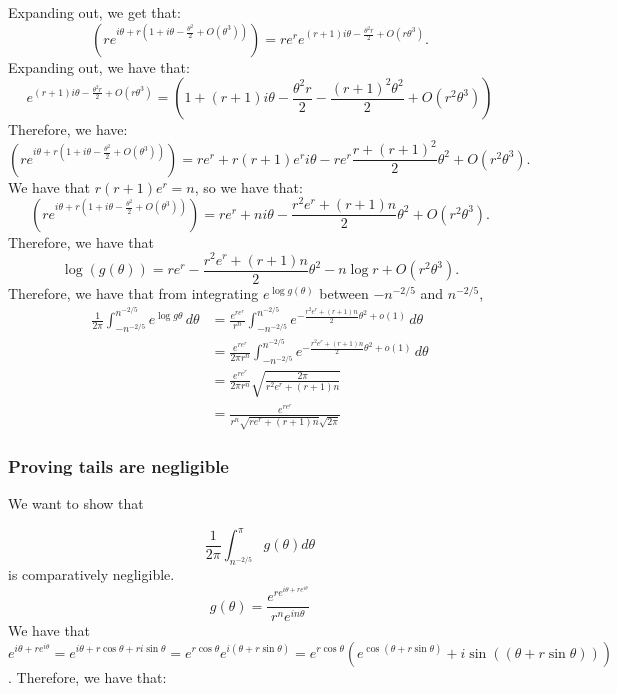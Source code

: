 \documentclass[]{article}
\theoremstyle{definition}
\numberwithin{theorem}{section}
\numberwithin{equation}{section}
\begin{document}
Expanding out, we get that:
\begin{equation}
	 (r e^{i \theta + r ( 1 + i \theta - \frac{\theta^2}{2} + O(\theta^3))}) = r e^r e^{(r + 1) i \theta- \frac{\theta^2 r}{2} + O(r\theta^3)}.
\end{equation}
Expanding out, we have that:
\begin{equation}
	e^{(r + 1) i \theta- \frac{\theta^2 r}{2} + O(r\theta^3)} = (1 + (r + 1) i \theta - \frac{\theta^2 r}{2} - \frac{(r + 1)^2 \theta^2}{2} + O(r^2 \theta^3))
\end{equation}
Therefore, we have:
\begin{equation}
	(r e^{i \theta + r ( 1 + i \theta - \frac{\theta^2}{2} + O(\theta^3))}) = r e^r + r(r + 1) e^r i \theta - r e^r \frac{r + (r + 1)^2 }{2} \theta^2 + O(r^2 \theta^3).
\end{equation}
We have that $r(r + 1) e^r = n$, so we have that:
\begin{equation}
	(r e^{i \theta + r ( 1 + i \theta - \frac{\theta^2}{2} + O(\theta^3))}) = r e^r + n i \theta - \frac{r^2 e^r + (r + 1) n}{2} \theta^2 + O(r^2 \theta^3).
\end{equation}
Therefore, we have that
\begin{equation}
	\log(g(\theta)) = r e^r - \frac{r^2 e^r + (r + 1) n }{2} \theta^2 - n \log r + O(r^2 \theta^3).
\end{equation}
Therefore, we have that from integrating $e^{\log g(\theta)}$ between $-n^{-2/5}$ and $n^{-2/5}$, 
\begin{align*}
	\frac{1}{2 \pi}\int_{-n^{-2/5}}^{n^{-2/5}} e^{\log g \theta} \, d\theta &= \frac{e^{r e^r}}{r^n} \int_{-n^{-2/5}}^{n^{-2/5}} e^{- \frac{r^2 e^r + (r + 1) n }{2} \theta^2 + o(1)} \, d\theta\\
	&=  \frac{e^{r e^r}}{ 2 \pi r^n} \int_{-n^{-2/5}}^{n^{-2/5}} e^{- \frac{r^2 e^r + (r + 1) n }{2} \theta^2 + o(1)} \, d\theta\\
	&= \frac{e^{r e^r}}{2 \pi r^n}\sqrt{\frac{2\pi}{r^2 e^r + (r + 1) n}}\\
	&= \frac{e^{r e^r}}{r^n \sqrt{r e^r + (r + 1)n} \sqrt{2\pi}}
\end{align*}
\subsubsection{Proving tails are negligible}
We want to show that

\begin{equation}
	\frac{1}{2 \pi} \int_{n^{-2/5}}^\pi g(\theta) d\theta
\end{equation}
is comparatively negligible.
\begin{equation}
	g(\theta) = \frac{e^{r e^{i \theta + r e^{i \theta}}}}{r^n e^{i n \theta}}
\end{equation}
We have that $e^{i \theta + r e^{i \theta}} = e^{i \theta + r \cos \theta + r i \sin \theta} = e^{r \cos \theta} e^{i( \theta + r \sin \theta)} = e^{r \cos \theta}(e^{\cos(\theta + r \sin \theta)} + i \sin((\theta + r \sin \theta)) )$. 
Therefore, we have that:
\end{document}
